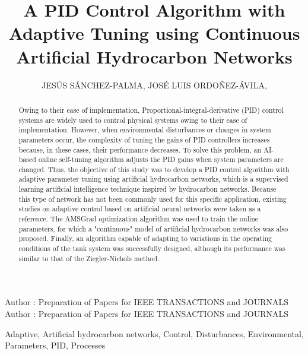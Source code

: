 \documentclass{ieeeaccess}
\begin{document}
\history{}
\doi{}

\title{A PID Control Algorithm with Adaptive Tuning using Continuous Artificial Hydrocarbon Networks\\}
\author{
\uppercase{Jesús Sánchez-Palma}, 
\uppercase{José Luis Ordoñez-Ávila}, 
}
\address[1]{Universidad Tecnológica Centroamericana (UNITEC), San Pedro Sula, Honduras (e-mail: jesuspalma0@unitec.edu)}
\address[2]{Universidad Tecnológica Centroamericana (UNITEC), San Pedro Sula, Honduras (e-mail: jlordonez@unitec.edu)}

\tfootnote{}

\markboth
{Author \headeretal: Preparation of Papers for IEEE TRANSACTIONS and JOURNALS}
{Author \headeretal: Preparation of Papers for IEEE TRANSACTIONS and JOURNALS}


\begin{abstract}
Owing to their ease of implementation, Proportional-integral-derivative (PID) control systems are widely used to control physical systems owing to their ease of implementation. However, when environmental disturbances or changes in system parameters occur, the complexity of tuning the gains of PID controllers increases because, in these cases, their performance decreases. To solve this problem, an AI-based online self-tuning algorithm adjusts the PID gains when system parameters are changed. Thus, the objective of this study was to develop a PID control algorithm with adaptive parameter tuning using artificial hydrocarbon networks, which is a supervised learning artificial intelligence technique inspired by hydrocarbon networks. Because this type of network has not been commonly used for this specific application, existing studies on adaptive control based on artificial neural networks were taken as a reference. The AMSGrad optimization algorithm was used to train the online parameters, for which a "continuous" model of artificial hydrocarbon networks was also proposed. Finally, an algorithm capable of adapting to variations in the operating conditions of the tank system was successfully designed, although its performance was similar to that of the Ziegler-Nichols method.
\end{abstract}

\begin{IEEEkeywords}
Adaptive, Artificial hydrocarbon networks, Control, Disturbances, Environmental, Parameters, PID, Processes
\end{IEEEkeywords}
\end{document}
